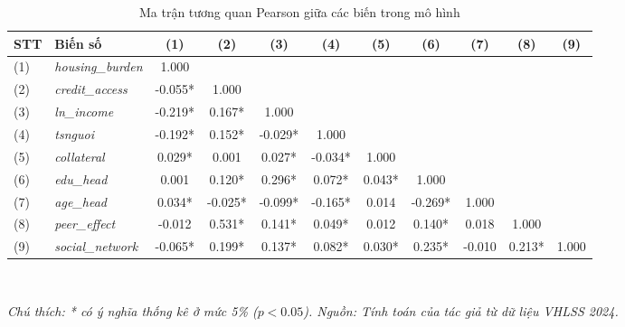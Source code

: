 \documentclass[12pt,a4paper]{report}
\begin{document}
\begin{table}[htbp]
	\centering
	\small
	\caption{Ma trận tương quan Pearson giữa các biến trong mô hình}
	\label{tab:app_correlation}
	\renewcommand{\arraystretch}{1.2}
	\setlength{\tabcolsep}{4.5pt} %
	\begin{tabular}{l l ccccccccc}
		\toprule
		\textbf{STT} & \textbf{Biến số} & \textbf{(1)} & \textbf{(2)} & \textbf{(3)} & \textbf{(4)} & \textbf{(5)} & \textbf{(6)} & \textbf{(7)} & \textbf{(8)} & \textbf{(9)} \\
		\midrule
		(1) & \textit{housing\_burden} & 1.000 & & & & & & & & \\
		(2) & \textit{credit\_access} & -0.055* & 1.000 & & & & & & & \\
		(3) & \textit{ln\_income} & -0.219* & 0.167* & 1.000 & & & & & & \\
		(4) & \textit{tsnguoi} & -0.192* & 0.152* & -0.029* & 1.000 & & & & & \\
		(5) & \textit{collateral} & 0.029* & 0.001 & 0.027* & -0.034* & 1.000 & & & & \\
		(6) & \textit{edu\_head} & 0.001 & 0.120* & 0.296* & 0.072* & 0.043* & 1.000 & & & \\
		(7) & \textit{age\_head} & 0.034* & -0.025* & -0.099* & -0.165* & 0.014 & -0.269* & 1.000 & & \\
		(8) & \textit{peer\_effect} & -0.012 & 0.531* & 0.141* & 0.049* & 0.012 & 0.140* & 0.018 & 1.000 & \\
		(9) & \textit{social\_network} & -0.065* & 0.199* & 0.137* & 0.082* & 0.030* & 0.235* & -0.010 & 0.213* & 1.000 \\
		\bottomrule
	\end{tabular}
	\vspace{0.1cm} \\
	\raggedright \footnotesize \textit{Chú thích: * có ý nghĩa thống kê ở mức 5\% ($p < 0.05$). Nguồn: Tính toán của tác giả từ dữ liệu VHLSS 2024.}
\end{table}

\vspace{0.5cm}
\end{document}
